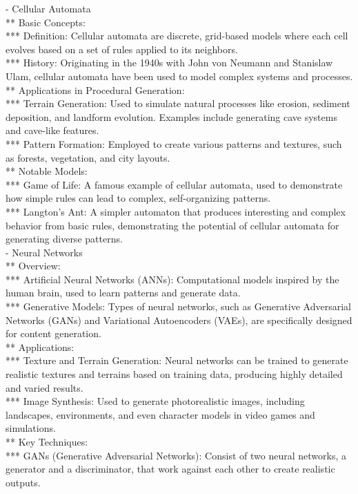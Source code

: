- Cellular Automata \\
** Basic Concepts: \\
*** Definition: Cellular automata are discrete, grid-based models where each cell evolves based on a set of rules applied to its neighbors. \\
*** History: Originating in the 1940s with John von Neumann and Stanislaw Ulam, cellular automata have been used to model complex systems and processes. \\
** Applications in Procedural Generation: \\
*** Terrain Generation: Used to simulate natural processes like erosion, sediment deposition, and landform evolution. Examples include generating cave systems and cave-like features. \\
*** Pattern Formation: Employed to create various patterns and textures, such as forests, vegetation, and city layouts. \\
** Notable Models: \\
*** Game of Life: A famous example of cellular automata, used to demonstrate how simple rules can lead to complex, self-organizing patterns. \\
*** Langton's Ant: A simpler automaton that produces interesting and complex behavior from basic rules, demonstrating the potential of cellular automata for generating diverse patterns. \\
- Neural Networks \\
** Overview: \\
*** Artificial Neural Networks (ANNs): Computational models inspired by the human brain, used to learn patterns and generate data. \\
*** Generative Models: Types of neural networks, such as Generative Adversarial Networks (GANs) and Variational Autoencoders (VAEs), are specifically designed for content generation. \\
** Applications: \\
*** Texture and Terrain Generation: Neural networks can be trained to generate realistic textures and terrains based on training data, producing highly detailed and varied results. \\
*** Image Synthesis: Used to generate photorealistic images, including landscapes, environments, and even character models in video games and simulations. \\
** Key Techniques: \\
*** GANs (Generative Adversarial Networks): Consist of two neural networks, a generator and a discriminator, that work against each other to create realistic outputs. \\
